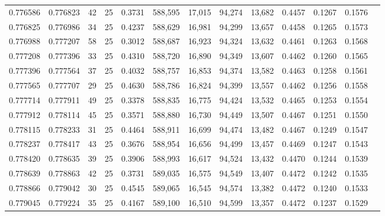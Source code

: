 \begin{tabular}{rrrrrrrrrrrrr}
0.776586 & 0.776823 &    42 &  25 &                                     0.3731 & 588,595 &  17,015 &  94,274 &  13,682 & 0.4457 & 0.1267 & 0.1576 \\
0.776825 & 0.776986 &    34 &  25 &                                     0.4237 & 588,629 &  16,981 &  94,299 &  13,657 & 0.4458 & 0.1265 & 0.1573 \\
0.776988 & 0.777207 &    58 &  25 &                                     0.3012 & 588,687 &  16,923 &  94,324 &  13,632 & 0.4461 & 0.1263 & 0.1568 \\
0.777208 & 0.777396 &    33 &  25 &                                     0.4310 & 588,720 &  16,890 &  94,349 &  13,607 & 0.4462 & 0.1260 & 0.1565 \\
0.777396 & 0.777564 &    37 &  25 &                                     0.4032 & 588,757 &  16,853 &  94,374 &  13,582 & 0.4463 & 0.1258 & 0.1561 \\
0.777565 & 0.777707 &    29 &  25 &                                     0.4630 & 588,786 &  16,824 &  94,399 &  13,557 & 0.4462 & 0.1256 & 0.1558 \\
0.777714 & 0.777911 &    49 &  25 &                                     0.3378 & 588,835 &  16,775 &  94,424 &  13,532 & 0.4465 & 0.1253 & 0.1554 \\
0.777912 & 0.778114 &    45 &  25 &                                     0.3571 & 588,880 &  16,730 &  94,449 &  13,507 & 0.4467 & 0.1251 & 0.1550 \\
0.778115 & 0.778233 &    31 &  25 &                                     0.4464 & 588,911 &  16,699 &  94,474 &  13,482 & 0.4467 & 0.1249 & 0.1547 \\
0.778237 & 0.778417 &    43 &  25 &                                     0.3676 & 588,954 &  16,656 &  94,499 &  13,457 & 0.4469 & 0.1247 & 0.1543 \\
0.778420 & 0.778635 &    39 &  25 &                                     0.3906 & 588,993 &  16,617 &  94,524 &  13,432 & 0.4470 & 0.1244 & 0.1539 \\
0.778639 & 0.778863 &    42 &  25 &                                     0.3731 & 589,035 &  16,575 &  94,549 &  13,407 & 0.4472 & 0.1242 & 0.1535 \\
0.778866 & 0.779042 &    30 &  25 &                                     0.4545 & 589,065 &  16,545 &  94,574 &  13,382 & 0.4472 & 0.1240 & 0.1533 \\
0.779045 & 0.779224 &    35 &  25 &                                     0.4167 & 589,100 &  16,510 &  94,599 &  13,357 & 0.4472 & 0.1237 & 0.1529 \\

\end{tabular}
